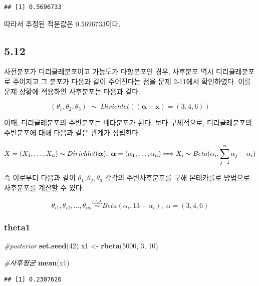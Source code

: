 \documentclass[
]{article}
\newenvironment{Shaded}{\begin{snugshade}}{\end{snugshade}}
\newcommand{\CommentTok}[1]{\textcolor[rgb]{0.56,0.35,0.01}{\textit{#1}}}
\newcommand{\DecValTok}[1]{\textcolor[rgb]{0.00,0.00,0.81}{#1}}
\newcommand{\FunctionTok}[1]{\textcolor[rgb]{0.13,0.29,0.53}{\textbf{#1}}}
\newcommand{\NormalTok}[1]{#1}
\newcommand{\OtherTok}[1]{\textcolor[rgb]{0.56,0.35,0.01}{#1}}
\begin{document}
\begin{verbatim}
## [1] 0.5696733
\end{verbatim}

따라서 추정된 적분값은 0.5696733이다.

\subsection{5.12}\label{section-1}

사전분포가 디리클레분포이고 가능도가 다항분포인 경우, 사후분포 역시
디리클레분포로 주어지고 그 분포가 다음과 같이 주어진다는 점을 문제
2-11에서 확인하였다. 이를 문제 상황에 적용하면 사후분포는 다음과 같다.

\[({\theta}_1, {\theta}_2, {\theta}_3) \;{\sim}\; Dirichlet((\boldsymbol{\alpha} + \mathbf{x}) = (3, 4, 6))\]

이때, 디리클레분포의 주변분포는 베타분포가 된다. 보다 구체적으로,
디리클레분포의 주변분포에 대해 다음과 같은 관계가 성립한다.

\[X = (X_1, \ldots, X_n) \;{\sim} \; Dirichlet(\boldsymbol{\alpha}), \; \boldsymbol{\alpha} = (\alpha_1, \ldots, \alpha_n) \Longrightarrow\\
X_i \;{\sim} \; Beta(\alpha_i,\sum_{j=1}^n \alpha_j - \alpha_i)\]

즉 이로부터 다음과 같이 \(\theta_1, \theta_2, \theta_3\) 각각의
주변사후분포를 구해 몬테카를로 방법으로 사후분포를 계산할 수 있다.

\[{\theta}_{i1}, {\theta}_{i2}, \ldots, {\theta}_{im} \stackrel{i.i.d.}{\sim} Beta(\alpha_i, 13 - \alpha_i), \; \alpha = (3, 4, 6)\]

\subsubsection{theta1}\label{theta1}

\begin{Shaded}
\begin{Highlighting}[]
\CommentTok{\#posterior}
\FunctionTok{set.seed}\NormalTok{(}\DecValTok{42}\NormalTok{)}
\NormalTok{x1 }\OtherTok{\textless{}{-}} \FunctionTok{rbeta}\NormalTok{(}\DecValTok{5000}\NormalTok{, }\DecValTok{3}\NormalTok{, }\DecValTok{10}\NormalTok{)}

\CommentTok{\#사후평균}
\FunctionTok{mean}\NormalTok{(x1)}
\end{Highlighting}
\end{Shaded}

\begin{verbatim}
## [1] 0.2307626
\end{verbatim}
\end{document}
